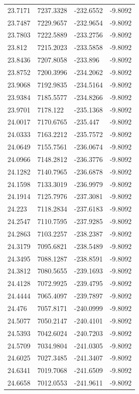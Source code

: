 \begin{table}[H]
\begin{tabular}{llll}
23.7171 & 7237.3328 & -232.6552 & -9.8092 \\
23.7487 & 7229.9657 & -232.9654 & -9.8092 \\
23.7803 & 7222.5889 & -233.2756 & -9.8092 \\
23.812 & 7215.2023 & -233.5858 & -9.8092 \\
23.8436 & 7207.8058 & -233.896 & -9.8092 \\
23.8752 & 7200.3996 & -234.2062 & -9.8092 \\
23.9068 & 7192.9835 & -234.5164 & -9.8092 \\
23.9384 & 7185.5577 & -234.8266 & -9.8092 \\
23.9701 & 7178.122 & -235.1368 & -9.8092 \\
24.0017 & 7170.6765 & -235.447 & -9.8092 \\
24.0333 & 7163.2212 & -235.7572 & -9.8092 \\
24.0649 & 7155.7561 & -236.0674 & -9.8092 \\
24.0966 & 7148.2812 & -236.3776 & -9.8092 \\
24.1282 & 7140.7965 & -236.6878 & -9.8092 \\
24.1598 & 7133.3019 & -236.9979 & -9.8092 \\
24.1914 & 7125.7976 & -237.3081 & -9.8092 \\
24.223 & 7118.2834 & -237.6183 & -9.8092 \\
24.2547 & 7110.7595 & -237.9285 & -9.8092 \\
24.2863 & 7103.2257 & -238.2387 & -9.8092 \\
24.3179 & 7095.6821 & -238.5489 & -9.8092 \\
24.3495 & 7088.1287 & -238.8591 & -9.8092 \\
24.3812 & 7080.5655 & -239.1693 & -9.8092 \\
24.4128 & 7072.9925 & -239.4795 & -9.8092 \\
24.4444 & 7065.4097 & -239.7897 & -9.8092 \\
24.476 & 7057.8171 & -240.0999 & -9.8092 \\
24.5077 & 7050.2147 & -240.4101 & -9.8092 \\
24.5393 & 7042.6024 & -240.7203 & -9.8092 \\
24.5709 & 7034.9804 & -241.0305 & -9.8092 \\
24.6025 & 7027.3485 & -241.3407 & -9.8092 \\
24.6341 & 7019.7068 & -241.6509 & -9.8092 \\
24.6658 & 7012.0553 & -241.9611 & -9.8092 \\

\end{tabular}
\end{table}
